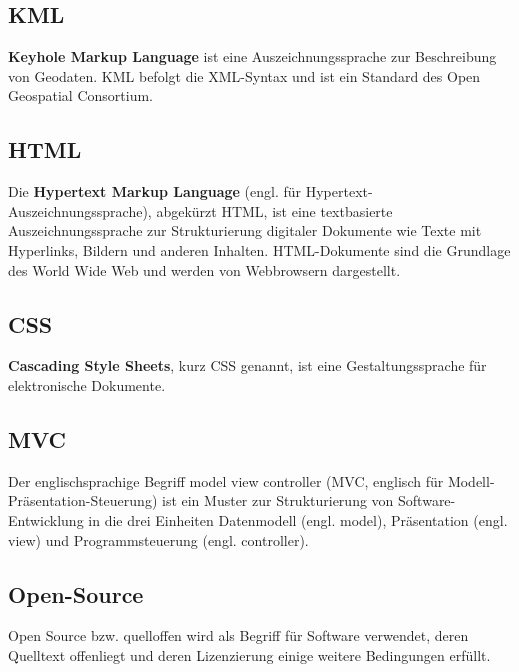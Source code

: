 \documentclass[11pt,a4paper]{article}
\begin{document}
\subsection{KML}
\textbf{Keyhole Markup Language} ist eine Auszeichnungssprache zur Beschreibung von Geodaten. KML befolgt die XML-Syntax und ist ein Standard des Open Geospatial Consortium.

\subsection{HTML}
Die \textbf{Hypertext Markup Language} (engl. für Hypertext-Auszeichnungssprache), abgekürzt HTML, ist eine textbasierte Auszeichnungssprache zur Strukturierung digitaler Dokumente wie Texte mit Hyperlinks, Bildern und anderen Inhalten. HTML-Dokumente sind die Grundlage des World Wide Web und werden von Webbrowsern dargestellt.

\subsection{CSS}
\textbf{Cascading Style Sheets}, kurz CSS genannt, ist eine Gestaltungssprache für elektronische Dokumente.

\subsection{MVC}
Der englischsprachige Begriff model view controller (MVC, englisch für Modell-Präsentation-Steuerung) ist ein Muster zur Strukturierung von Software-Entwicklung in die drei Einheiten Datenmodell (engl. model), Präsentation (engl. view) und Programmsteuerung (engl. controller).

\subsection{Open-Source}
Open Source bzw. quelloffen wird als Begriff für Software verwendet, deren Quelltext offenliegt und deren Lizenzierung einige weitere Bedingungen erfüllt.
\end{document}
